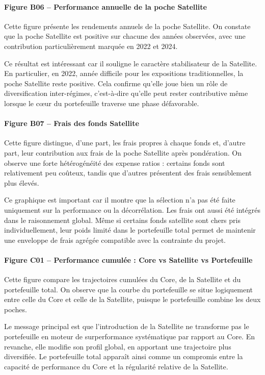 \documentclass{article}
\begin{document}
\paragraph{Figure B06 -- Performance annuelle de la poche Satellite}
Cette figure présente les rendements annuels de la poche Satellite. On constate que la poche Satellite est positive sur chacune des années observées, avec une contribution particulièrement marquée en 2022 et 2024.

Ce résultat est intéressant car il souligne le caractère stabilisateur de la Satellite. En particulier, en 2022, année difficile pour les expositions traditionnelles, la poche Satellite reste positive. Cela confirme qu’elle joue bien un rôle de diversification inter-régimes, c’est-à-dire qu’elle peut rester contributive même lorsque le cœur du portefeuille traverse une phase défavorable.

\paragraph{Figure B07 -- Frais des fonds Satellite}
Cette figure distingue, d’une part, les frais propres à chaque fonds et, d’autre part, leur contribution aux frais de la poche Satellite après pondération. On observe une forte hétérogénéité des expense ratios : certains fonds sont relativement peu coûteux, tandis que d’autres présentent des frais sensiblement plus élevés.

Ce graphique est important car il montre que la sélection n’a pas été faite uniquement sur la performance ou la décorrélation. Les frais ont aussi été intégrés dans le raisonnement global. Même si certains fonds satellite sont chers pris individuellement, leur poids limité dans le portefeuille total permet de maintenir une enveloppe de frais agrégée compatible avec la contrainte du projet.

\paragraph{Figure C01 -- Performance cumulée : Core vs Satellite vs Portefeuille}
Cette figure compare les trajectoires cumulées du Core, de la Satellite et du portefeuille total. On observe que la courbe du portefeuille se situe logiquement entre celle du Core et celle de la Satellite, puisque le portefeuille combine les deux poches.

Le message principal est que l’introduction de la Satellite ne transforme pas le portefeuille en moteur de surperformance systématique par rapport au Core. En revanche, elle modifie son profil global, en apportant une trajectoire plus diversifiée. Le portefeuille total apparaît ainsi comme un compromis entre la capacité de performance du Core et la régularité relative de la Satellite.
\end{document}
